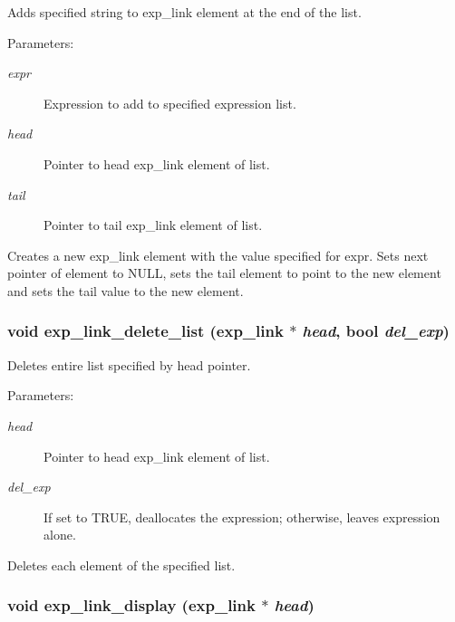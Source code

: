 Adds specified string to exp\_\-link element at the end of the list.

\begin{Desc}
\item[Parameters: ]\par
\begin{description}
\item[{\em 
expr}]Expression to add to specified expression list. \item[{\em 
head}]Pointer to head exp\_\-link element of list. \item[{\em 
tail}]Pointer to tail exp\_\-link element of list.\end{description}
\end{Desc}
Creates a new exp\_\-link element with the value specified for expr. Sets next pointer of element to NULL, sets the tail element to point to the new element and sets the tail value to the new element. 
\subsubsection{\setlength{\rightskip}{0pt plus 5cm}void exp\_\-link\_\-delete\_\-list ({\bf exp\_\-link} $\ast$ {\em head}, {\bf bool} {\em del\_\-exp})}\label{link_8c_a13}


Deletes entire list specified by head pointer.

\begin{Desc}
\item[Parameters: ]\par
\begin{description}
\item[{\em 
head}]Pointer to head exp\_\-link element of list. \item[{\em 
del\_\-exp}]If set to TRUE, deallocates the expression; otherwise, leaves expression alone.\end{description}
\end{Desc}
Deletes each element of the specified list. 
\subsubsection{\setlength{\rightskip}{0pt plus 5cm}void exp\_\-link\_\-display ({\bf exp\_\-link} $\ast$ {\em head})}\label{link_8c_a5}


